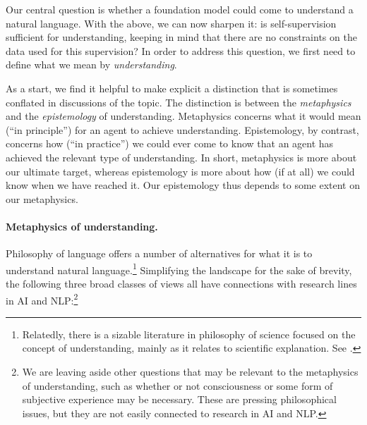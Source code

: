 Our central question is whether a foundation model could come to understand a natural language. With the above, we can now sharpen it: is self-supervision sufficient for understanding, keeping in mind that there are no constraints on the data used for this supervision? In order to address this question, we first need to define what we mean by \textit{understanding}.

As a start, we find it helpful to make explicit a distinction that is sometimes conflated in discussions of the topic. The distinction is between the \textit{metaphysics} and the \textit{epistemology} of understanding. Metaphysics concerns what it would mean (“in principle”) for an agent to achieve understanding. Epistemology, by contrast, concerns how (“in practice”) we could ever come to know that an agent has achieved the relevant type of understanding. In short, metaphysics is more about our ultimate target, whereas epistemology is more about how (if at all) we could know when we have reached it. Our epistemology thus depends to some extent on our metaphysics. 

\paragraph{Metaphysics of understanding.} 

Philosophy of language offers a number of alternatives for what it is to understand natural language.\footnote{Relatedly, there is a sizable literature in philosophy of science focused on the concept of understanding, mainly as it relates to scientific explanation. See \citet{grimm2021understanding}.} Simplifying the landscape for the sake of brevity, the following three broad classes of views all have connections with research lines in AI and NLP:\footnote{We are leaving aside other questions that may be relevant to the metaphysics of understanding, such as whether or not consciousness or some form of subjective experience may be necessary. These are pressing philosophical issues, but they are not easily connected to research in AI and NLP.}

